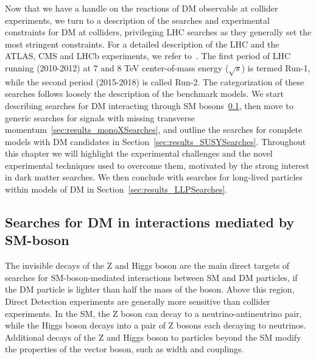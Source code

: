 Now that we have a handle on the reactions of DM observable at collider experiments, we turn to a description of the searches and experimental constraints for DM at colliders, privileging LHC searches as they generally set the most stringent constraints. For a detailed description of the LHC and the ATLAS, CMS and LHCb experiments, we refer to~\cite{LHC2008,ATLAS2008,CMS2008}. %
The first period of LHC running (2010-2012) at 7 and 8 TeV center-of-mass energy ($\sqrt{s}$) is termed Run-1, while the second period (2015-2018) is called Run-2. 
The categorization of these searches follows loosely the description of the benchmark models. We start describing searches for DM interacting through SM bosons~\ref{sec:results_ZHSearches}, then move to generic searches for signals with missing transverse momentum~\ref{sec:results_monoXSearches}, and outline the searches for complete models with DM candidates in Section~\ref{sec:results_SUSYSearches}. Throughout this chapter
we will highlight the experimental challenges and the novel experimental techniques used to overcome them,
motivated by the strong interest in dark matter searches. 
We then conclude with searches for long-lived particles within models of DM in
Section~\ref{sec:results_LLPSearches}. %

\subsection{Searches for DM in interactions mediated by SM-boson}
\label{sec:results_ZHSearches}

The invisible decays of the Z and Higgs boson are the main direct targets of searches for SM-boson-mediated interactions between SM and DM particles, if the DM particle is lighter than half the mass of the boson. Above this region, Direct Detection experiments are generally more sensitive than collider experiments. 
In the SM, the Z boson can decay to a neutrino-antineutrino pair, while the Higgs boson decays into a pair of Z bosons each decaying to neutrinos. Additional decays of the Z and Higgs boson to particles beyond the SM modify the properties of the vector boson, such as width and couplings. 

